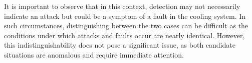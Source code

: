 It is important to observe that in this context, detection may not necessarily indicate an attack but could be a symptom of a fault in the cooling system. In such circumstances, distinguishing between the two cases can be difficult as the conditions under which attacks and faults occur are nearly identical. However, this indistinguishability does not pose a significant issue, as both candidate situations are anomalous and require immediate attention.









